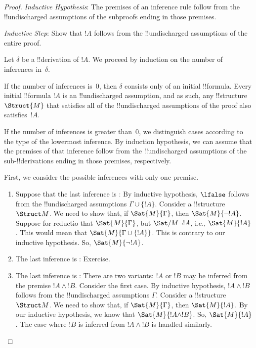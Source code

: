 \documentclass[../../include/open-logic-section]{subfiles}
\begin{document}
\begin{proof}
\emph{Inductive Hypothesis}: The premises of an inference rule follow
from the !!{undischarged} assumptions of the subproofs ending in those premises.
 
\emph{Inductive Step}: Show that $!A$ follows from the
!!{undischarged} assumptions of the entire proof.

Let $\delta$ be a !!{derivation} of $!A$. We proceed by
induction on the number of inferences in~$\delta$.

If the number of inferences is~0, then $\delta$ consists only of an
initial !!{formula}. Every initial !!{formula} $!A$ is an
!!{undischarged} assumption, and as such, any !!{structure}
$\Struct{M}$ that satisfies all of the !!{undischarged} assumptions of
the proof also satisfies~$!A$.

If the number of inferences is greater than~0, we distinguish cases
according to the type of the lowermost inference. By induction
hypothesis, we can assume that the premises of that inference follow
from the !!{undischarged} assumptions of the sub-!!{derivation}s
ending in those premises, respectively.

First, we consider the possible inferences with only one premise.

\begin{enumerate}
\item Suppose that the last inference is \Intro{\lnot}: By inductive
  hypothesis, $\lfalse$ follows from the !!{undischarged} assumptions
  $\Gamma \cup \{!A\}$. Consider a !!{structure}~$\Struct M$. We need
  to show that, if $\Sat{M}{\Gamma}$, then $\Sat{M}{\lnot
    !A}$. Suppose for reductio that $\Sat{M}{\Gamma}$, but
  $\Sat/{M}{\lnot !A}$, i.e., $\Sat{M}{!A}$. This would mean that
  $\Sat{M}{\Gamma \cup \{!A\}}$. This is contrary to our inductive
  hypothesis. So, $\Sat{M}{\lnot !A}$.
  
\item The last inference is \Elim{\lnot}: Exercise.

\item The last inference is \Elim{\land}: There are two variants: $!A$
  or $!B$ may be inferred from the premise $!A \land !B$. Consider the
  first case.  By inductive hypothesis, $!A \land !B$ follows from the
  !!{undischarged} assumptions $\Gamma$. Consider a
  !!{structure}~$\Struct M$. We need to show that, if
  $\Sat{M}{\Gamma}$, then $\Sat{M}{!A}$. By our inductive
  hypothesis, we know that $\Sat{M}{!A\land !B}$. So, $\Sat{M}{!A}$.
  The case where $!B$ is inferred from $!A \land !B$ is handled
  similarly.
  

\end{enumerate}
\end{proof}
\end{document}
